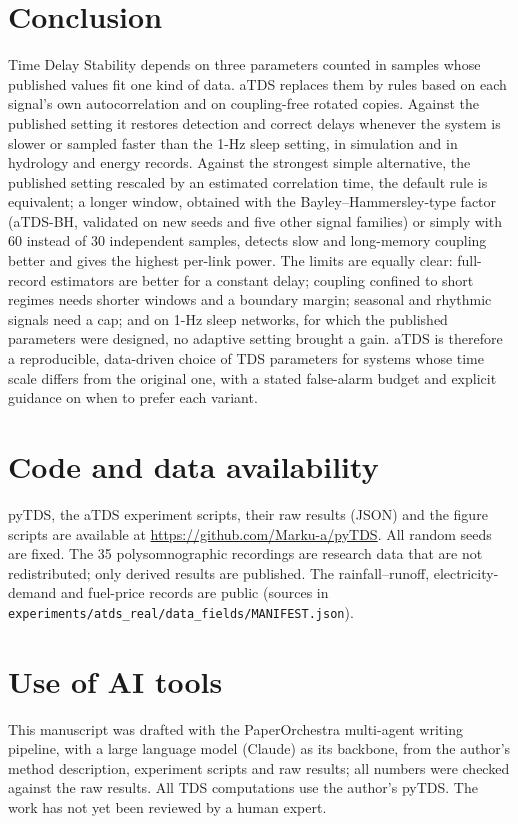 \documentclass[11pt,a4paper]{article}
\begin{document}
\section{Conclusion}
\label{sec:conclusion}
Time Delay Stability depends on three parameters counted in samples whose published values fit one kind of data. aTDS replaces them by rules based on each signal's own autocorrelation and on coupling-free rotated copies. Against the published setting it restores detection and correct delays whenever the system is slower or sampled faster than the 1-Hz sleep setting, in simulation and in hydrology and energy records. Against the strongest simple alternative, the published setting rescaled by an estimated correlation time, the default rule is equivalent; a longer window, obtained with the Bayley--Hammersley-type factor (aTDS-BH, validated on new seeds and five other signal families) or simply with 60 instead of 30 independent samples, detects slow and long-memory coupling better and gives the highest per-link power. The limits are equally clear: full-record estimators are better for a constant delay; coupling confined to short regimes needs shorter windows and a boundary margin; seasonal and rhythmic signals need a cap; and on 1-Hz sleep networks, for which the published parameters were designed, no adaptive setting brought a gain. aTDS is therefore a reproducible, data-driven choice of TDS parameters for systems whose time scale differs from the original one, with a stated false-alarm budget and explicit guidance on when to prefer each variant.

\section*{Code and data availability}
pyTDS, the aTDS experiment scripts, their raw results (JSON) and the figure scripts are available at \url{https://github.com/Marku-a/pyTDS}. All random seeds are fixed. The 35 polysomnographic recordings are research data that are not redistributed; only derived results are published. The rainfall--runoff, electricity-demand and fuel-price records are public (sources in \texttt{experiments/atds\_real/data\_fields/MANIFEST.json}).

\section*{Use of AI tools}
This manuscript was drafted with the PaperOrchestra multi-agent writing pipeline, with a large language model (Claude) as its backbone, from the author's method description, experiment scripts and raw results; all numbers were checked against the raw results. All TDS computations use the author's pyTDS. The work has not yet been reviewed by a human expert.
\end{document}
